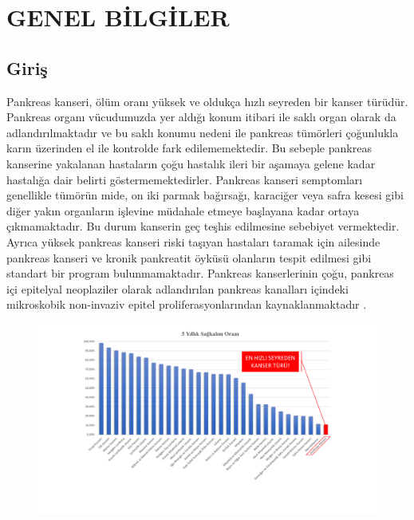\chapter{GENEL BİLGİLER \label{sec:genel}}

\section{Giriş}
\label{sec:GenelBilgiler_giris}
Pankreas kanseri, ölüm oranı yüksek ve oldukça hızlı seyreden bir kanser türüdür. Pankreas organı vücudumuzda yer aldığı konum itibari ile saklı organ olarak da adlandırılmaktadır ve bu saklı konumu nedeni ile pankreas tümörleri çoğunlukla karın üzerinden el ile kontrolde fark edilememektedir. Bu sebeple pankreas kanserine yakalanan hastaların çoğu hastalık ileri bir aşamaya gelene kadar hastalığa dair belirti göstermemektedirler. Pankreas kanseri semptomları genellikle tümörün mide, on iki parmak bağırsağı, karaciğer veya safra kesesi gibi diğer yakın organların işlevine müdahale etmeye başlayana kadar ortaya çıkmamaktadır. Bu durum kanserin geç teşhis edilmesine sebebiyet vermektedir. Ayrıca yüksek pankreas kanseri riski taşıyan hastaları taramak için ailesinde pankreas kanseri ve kronik pankreatit öyküsü olanların tespit edilmesi gibi standart bir program bulunmamaktadır. Pankreas kanserlerinin çoğu, pankreas içi epitelyal neoplaziler olarak adlandırılan pankreas kanalları içindeki mikroskobik non-invaziv epitel proliferasyonlarından kaynaklanmaktadır \cite{kamisawa2016pancreatic,mizrahi2020pancreatic,hidalgo2010pancreatic}. 

\begin{figure}[h!]
	\begin{center}
		\vspace{0.4cm}
		{
			\vspace{0.4cm}
			\includegraphics[scale=0.62]{Genel-Bilgiler/Figures/seer_statistic.pdf}
		}
	\end{center}
\end{figure}

